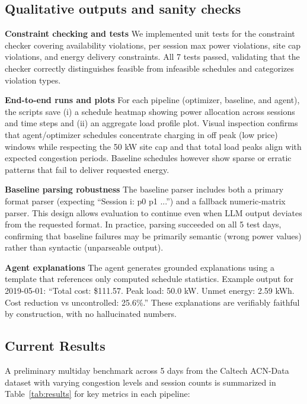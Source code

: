 \documentclass{article}
\begin{document}
\subsection{Qualitative outputs and sanity checks}
\textbf{Constraint checking and tests}
We implemented unit tests for the constraint checker covering availability violations, per session max power violations, site cap violations, and energy delivery constraints. All 7 tests passed, validating that the checker correctly distinguishes feasible from infeasible schedules and categorizes violation types.

\textbf{End-to-end runs and plots}
For each pipeline (optimizer, baseline, and agent), the scripts save (i) a schedule heatmap showing power allocation across sessions and time steps and (ii) an aggregate load profile plot. Visual inspection confirms that agent/optimizer schedules concentrate charging in off peak (low price) windows while respecting the 50 kW site cap and that total load peaks align with expected congestion periods. Baseline schedules however show sparse or erratic patterns that fail to deliver requested energy.

\textbf{Baseline parsing robustness}
The baseline parser includes both a primary format parser (expecting ``Session i: p0 p1 ...'') and a fallback numeric-matrix parser. This design allows evaluation to continue even when LLM output deviates from the requested format. In practice, parsing succeeded on all 5 test days, confirming that baseline failures may be primarily semantic (wrong power values) rather than syntactic (unparseable output).

\textbf{Agent explanations}
The agent generates grounded explanations using a template that references only computed schedule statistics. Example output for 2019-05-01: ``Total cost: \$111.57. Peak load: 50.0 kW. Unmet energy: 2.59 kWh. Cost reduction vs uncontrolled: 25.6\%.'' These explanations are verifiably faithful by construction, with no hallucinated numbers.

\newpage
\subsection{Current Results}
A preliminary multiday benchmark across 5 days from the Caltech ACN-Data dataset with varying congestion levels and session counts is summarized in Table~\ref{tab:results} for key metrics in each pipeline:
\end{document}
